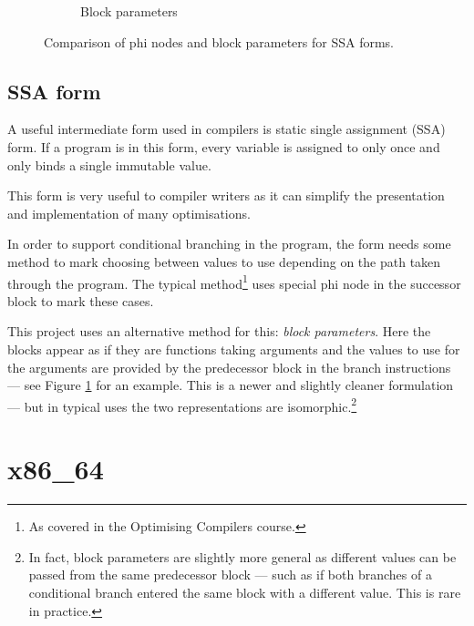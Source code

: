 \begin{figure}[h]
\begin{subfigure}[b]{0.5\textwidth}

        \caption{Block parameters}

    \end{subfigure}
    \caption{Comparison of phi nodes and block parameters for SSA forms.}
    \label{fig:phi-bp}
\end{figure}

\subsection{SSA form} \label{ssa}

A useful intermediate form used in compilers is static single assignment (SSA) form. If a program
is in this form,
every variable is assigned to only once and only binds a single immutable value.

This form is very useful to compiler writers as it can simplify the presentation and implementation
of many optimisations.

In order to support conditional branching in the program, the form needs some method to mark
choosing between values to use depending on the path taken through the program. The typical
method\footnote{As covered in the Optimising Compilers course.} uses special phi node in the
successor block to mark these cases.

This project uses an alternative method for this: \emph{block parameters}.
Here the blocks appear as if they are functions taking arguments and the values to use for the
arguments are provided by the predecessor block in the branch instructions --- see Figure
\ref{fig:phi-bp} for an example. This is a newer and slightly cleaner formulation --- but in
typical uses
the two representations are isomorphic.\footnote{In fact, block parameters are slightly more
    general as different values can be passed from the same predecessor block --- such as if both
    branches of a conditional branch entered the same block with a different value. This is rare in
    practice.}

\section{x86\_64}

